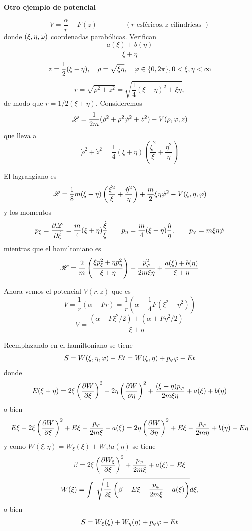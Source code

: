\documentclass[10pt,oneside]{CBFT_book}
\begin{document}
\begin{ejemplo}{\bf Otro ejemplo de potencial}

\[
	V = \frac{\alpha}{r} - F(z) \qquad \qquad ( r \text{ esféricos}, z \text{ cilíndricas })
\]
donde $(\xi, \eta, \varphi)$ coordenadas parabólicas. Verifican
\[
	\frac{ a(\xi) + b(\eta) }{\xi + \eta}
\]
\[
	z = \frac 1 2 ( \xi - \eta ), \quad \rho =  \sqrt{\xi \eta}, \quad \varphi \in \{ 0, 2\pi \}, 0 < \xi, \eta < \infty 
\] 
\[
	r = \sqrt{ \rho^2 + z^2 } = \sqrt{ \frac{1}{4} ( \xi - \eta )^2 + \xi \eta },
\]
de modo que $r = 1/2 (\xi + \eta)$. Consideremos
\[
	\mathscr{L}  = \frac{1}{2m} ( \dot{\rho}^2 + \rho^2 \dot{\varphi}^2 + \dot{z}^2 ) - V(\rho,\varphi,z)
\]
que lleva a 
\[
	\dot{\rho}^2 + \dot{z}^2 = \frac{1}{4} ( \xi + \eta )\left( \frac{\dot{\xi}^2}{\xi} + \frac{\dot{\eta}^2}{\eta} \right)
\]

El lagrangiano es
\[
	\mathscr{L} = \frac{1}{8} m (\xi + \eta) \left( \frac{\dot{\xi}^2}{\xi} + \frac{\dot{\eta}^2}{\eta} \right) +
	\frac{m}{2}\xi\eta\dot{\varphi}^2 - V(\xi,\eta,\varphi)
\]
y los momentos 
\[
	p_\xi = \frac{\partial^{\hspace{-0.05em}} {\mathscr{L}}}{\partial {\dot{\xi}}^{\hspace{-0.05em}}} = \frac{m}{4} (\xi + \eta) \frac{\dot{\xi}}{\xi} \qquad 
	p_\eta = \frac{m}{4} (\xi + \eta) \frac{\dot{\eta}}{\eta}, \qquad
	p_\varphi = m \xi \eta \dot{ \varphi }
\]
mientras que el hamiltoniano es
\[
	\mathscr{H} = \frac{2}{m} \left( \frac{  \xi p_\xi^2 + \eta p_\eta^2  }{  \xi + \eta  } \right) + \frac{ p_\varphi^2 }{ 2 m \xi \eta } + 
	\frac{ a(\xi) + b(\eta) }{ \xi + \eta }
\]

Ahora vemos el potencial $V(r,z)$ que es 
\[
	V = \frac{1}{r} ( \alpha - Fr ) = \frac{1}{r} ( \alpha - \frac{1}{4} F ( \xi^2 - \eta^2 ) )
\]
\[
	V = \frac{( \alpha - F \xi^2 / 2 ) + ( \alpha + F \eta^2 / 2 )}{\xi + \eta}
\]
 
Reemplazando en el hamiltoniano se tiene 
\[
	S = W(\xi,\eta,\varphi) - Et = W(\xi,\eta) + p_\varphi \varphi - Et
\]
donde
\[
	E(\xi + \eta) = 2 \xi \left( \frac{\partial^{\hspace{-0.05em}} {W}}{\partial {\xi}^{\hspace{-0.05em}}} \right)^2 + 2 \eta \left( \frac{\partial^{\hspace{-0.05em}} {W}}{\partial {\eta}^{\hspace{-0.05em}}} \right)^2 + \frac{(\xi + \eta)p_\varphi}{2 m \xi \eta} + a(\xi) + b(\eta)
\]
o bien 
\[
	E\xi - 2 \xi \left( \frac{\partial^{\hspace{-0.05em}} {W}}{\partial {\xi}^{\hspace{-0.05em}}} \right)^2 + E\xi - \frac{p_\varphi}{2 m \xi} - a(\xi) =  2 \eta \left( \frac{\partial^{\hspace{-0.05em}} {W}}{\partial {\eta}^{\hspace{-0.05em}}} \right)^2 + E\xi - \frac{p_\varphi}{2 m \eta} + b(\eta) - E\eta  
\]
y como $ W(\xi,\eta) = W_\xi(\xi) + W_eta(\eta) $ se tiene 
\[
	\beta =  2 \xi \left( \frac{\partial^{\hspace{-0.05em}} {W_\xi}}{\partial {\xi}^{\hspace{-0.05em}}} \right)^2 + \frac{p_\varphi}{2 m \xi} + a(\xi) -E\xi
\]
\[
	W(\xi) = \int \; \sqrt{ \frac{1}{2\xi} \left( \beta + E\xi - \frac{p_\varphi}{2 m \xi} - a(\xi) \right)} d\xi,
\]
o bien
\[
	S = W_\xi(\xi) + W_\eta(\eta) + p_\varphi \varphi - Et
\]

\end{ejemplo}







\end{document}
